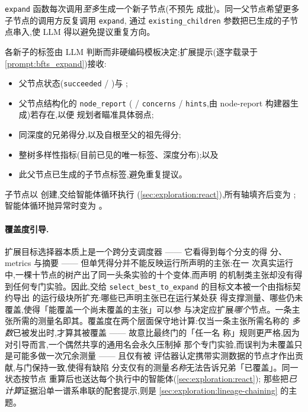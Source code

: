 \texttt{expand} 函数每次调用\emph{至多}生成一个新子节点(不预先
成批)。同一父节点希望更多子节点的调用方反复调用 \texttt{expand},
通过 \texttt{existing\_children} 参数把已生成的子节点串入,使 LLM
得以避免提议重复方向。

各新子的标签由 LLM 判断而非硬编码模板决定;扩展提示(逐字载录于
\cref{prompt:bfts_expand})接收:

\begin{itemize}
  \item 父节点状态(\texttt{succeeded} /
        )与
        ;
  \item 父节点结构化的 \texttt{node\_report}
        ( / \texttt{concerns} /
        \texttt{hints},由 node-report 构建器生成)若存在,以便
        规划者瞄准具体弱点;
  \item 同深度的兄弟得分,以及自根至父的祖先得分;
  \item 整树多样性指标(目前已见的唯一标签、深度分布);以及
  \item 此父节点已生成的子节点标签,避免重复提议。
\end{itemize}

子节点以 \StateOpen{} 创建,交给智能体循环执行
(\cref{sec:exploration:react}),所有轴填齐后变为
\StateDone{};智能体循环抛异常时变为 \StateFailed{}。

\paragraph{覆盖度引导.}
扩展目标选择器本质上是一个跨分支调度器 —— 它看得到每个分支的得
分、metrics 与摘要 —— 但单凭得分并不能反映运行所声明的主张:在一
次真实运行中,一棵十节点的树产出了同一头条实验的十个变体,而声明
的机制类主张却没有得到任何专门实验。因此,交给
\texttt{select\_best\_to\_expand} 的目标文本被一个由指标契约导出
的运行级块所扩充:哪些已声明主张已在运行某处获
得支撑测量、哪些仍未覆盖,使得「能覆盖一个尚未覆盖的主张」可以参
与决定应扩展\emph{哪个}节点。一条主张所需的测量名即其。覆盖度在两个层面保守地计算:仅当一条主张所需名称的
\emph{多数}已被发出时,才算其被覆盖 —— 故意比最终门的「任一名
称」规则更严格,因为对引导而言,一个偶然共享的通用名会永久压制掉
那个专门实验,而误判为未覆盖只是可能多做一次冗余测量 —— 且仅有被
评估器认定携带实测数据的节点才作出贡献,与门保持一致,使得有缺陷
分支仅有的测量\emph{名称}无法告诉兄弟「已覆盖」。同一状态按节点
重算后也送达每个执行中的智能体(\cref{sec:exploration:react});
那些把\emph{已计算}证据沿单一谱系串联的配套提示,则是
\cref{sec:exploration:lineage-chaining} 的主题。

